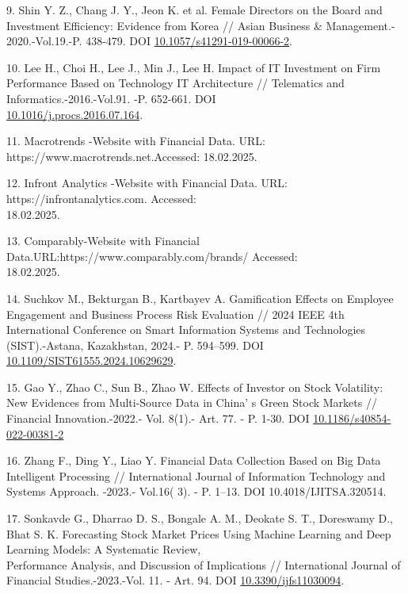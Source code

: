 \begin{references}
9. Shin Y. Z., Chang J. Y., Jeon K. et al. Female Directors on the Board
and Investment Efficiency: Evidence from Korea // Asian Business \&
Management.- 2020.-Vol.19.-P. 438-479.
DOI \href{https://doi.org/10.1057/s41291-019-00066-2}{10.1057/s41291-019-00066-2}.

10. Lee H., Choi H., Lee J., Min J., Lee H. Impact of IT Investment on
Firm Performance Based on Technology IT Architecture // Telematics and
Informatics.-2016.-Vol.91. -P. 652-661.
DOI \\\href{https://doi.org/10.1016/j.procs.2016.07.164}{10.1016/j.procs.2016.07.164}.

11. Macrotrends -Website with Financial Data. URL:
https://www.macrotrends.net.Accessed: 18.02.2025.

12. Infront Analytics -Website with Financial Data. URL:
https://infrontanalytics.com. Accessed: \\18.02.2025.

13. Comparably-Website with Financial
Data.URL:https://www.comparably.com/brands/ Accessed: \\18.02.2025.

14. Suchkov M., Bekturgan B., Kartbayev A. Gamification Effects on
Employee Engagement and Business Process Risk Evaluation // 2024 IEEE
4th International Conference on Smart Information Systems and
Technologies (SIST).-Astana, Kazakhstan, 2024.- P. 594--599.
DOI \href{https://doi.org/10.1109/SIST61555.2024.10629629}{10.1109/SIST61555.2024.10629629}.

15. Gao Y., Zhao C., Sun B., Zhao W. Effects of Investor on Stock
Volatility: New Evidences from Multi-Source Data in
China' s Green Stock Markets // Financial
Innovation.-2022.- Vol. 8(1).- Art. 77. - P. 1-30. DOI
\href{https://doi.org/10.1186/s40854-022-00381-2}{10.1186/s40854-022-00381-2}

16. Zhang F., Ding Y., Liao Y. Financial Data Collection Based on Big
Data Intelligent Processing // International Journal of Information
Technology and Systems Approach. -2023.- Vol.16( 3). - P. 1--13. DOI
10.4018/IJITSA.320514.

17. Sonkavde G., Dharrao D. S., Bongale A. M., Deokate S. T., Doreswamy
D., Bhat S. K. Forecasting Stock Market Prices Using Machine Learning
and Deep Learning Models: A Systematic Review, \\Performance Analysis, and
Discussion of Implications // International Journal of Financial
Studies.-2023.-Vol. 11. - Art. 94. DOI
\href{https://doi.org/10.3390/ijfs11030094}{10.3390/ijfs11030094}.


\end{references}
